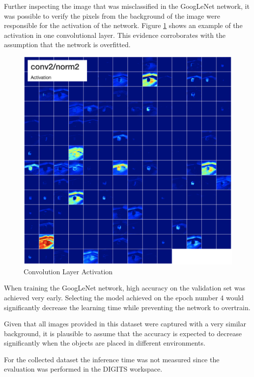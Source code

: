 \documentclass[10pt,journal,compsoc]{IEEEtran}
\begin{document}
Further inspecting the image that was misclassified in the GoogLeNet network, it was possible to verify the pixels from the background of the image were responsible for the activation of the network. Figure \ref{fig:activation} shows an example of the activation in one convolutional layer. This evidence corroborates with the assumption that the network is overfitted. 
\begin{figure}[thpb]
      \centering
      \includegraphics[width=\linewidth]{o_err2.png}
      \caption{Convolution Layer Activation}
      \label{fig:activation}
\end{figure}

When training the GoogLeNet network, high accuracy on the validation set was achieved very early. Selecting the model achieved on the epoch number 4 would significantly decrease the learning time while preventing the network to overtrain.

Given that all images provided in this dataset were captured with a very similar background, it is plausible to assume that the accuracy is expected to decrease significantly when the objects are placed in different environments. 

For the collected dataset the inference time was not measured since the evaluation was performed in the DIGITS workspace.
\end{document}
